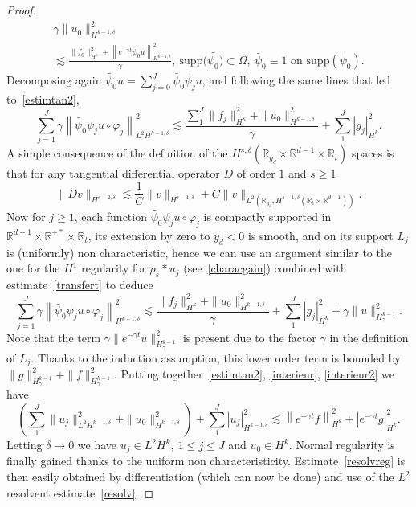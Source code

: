 \documentclass[10pt]{amsart}
\theoremstyle{definition}\newtheorem{defi}[theo]{Definition}\newtheorem{rema}[theo]{Remark}\newtheorem{exam}[theo]{Example}\newtheorem{exem}[theo]{Example}\newtheorem{nota}[theo]{Notation}
\newcommand{\R}{\mathbb{R}}
\newcommand{\supp}{\mathrm{supp}}
\begin{document}
\begin{proof}
\begin{multline}\label{interieur}
\gamma \|u_0\|_{H^{k-1,\delta}}^2
\\
\lesssim \frac{\|f_0\|_{H^k}^2 +\left\|e^{-\gamma t}\widetilde{\psi_0}u\right\|_{H^{k-1,\delta}}^2}{\gamma},\ \supp(\widetilde{\psi_0)}\subset \Omega,\
\widetilde{\psi_0}\equiv 1\text{ on }
\supp(\psi_0).
\end{multline}
Decomposing again $\widetilde{\psi_0}u =\sum_{j=0}^J \widetilde{\psi_0}\psi_ju$, and following the same lines that led to~\eqref{estimtan2},
\begin{equation}
\sum_{j=1}^J\gamma \left\|\widetilde{\psi_0}
\psi_j u\circ \varphi_j\right\|_{L^2H^{k-1,\delta}}^2 \lesssim
\frac{\sum_1^J\|f_j\|_{H^k}^2+\|u_0\|_{H^{k-1,\delta}}^2}{\gamma}+\sum_1^J|g_j|_{H^k}^2.
\end{equation}
A simple consequence of the definition of the $H^{s,\delta}(\R_{y_d}\times \R^{d-1}\times \R_t)$ spaces is that for any tangential differential operator $D$ of order $1$ and $s\geq 1$
\begin{equation}\label{transfert}
\|Dv\|_{H^{s-2,\delta}}\lesssim
\frac{1}{C}\|v\|_{H^{s-1,\delta}}+C\|v\|_{L^2\left(\R_{y_d},H^{s-1,\delta}\left(\R_t\times \R^{d-1}\right)\right)}.
\end{equation}
Now for $j\geq 1$, each function $\widetilde{\psi_0}\psi_ju\circ \varphi_j$ is compactly supported in $\R^{d-1}\times \R^{+*}\times \R_t$, its extension by zero to $y_d<0$ is smooth, and on its support $L_j$ is (uniformly) non characteristic, hence we can use an argument similar to the one for the $H^1$ regularity for $\rho_\varepsilon*u_j$ (see~\eqref{characgain}) combined with estimate~\eqref{transfert} to deduce
\begin{equation}\label{interieur2}
\sum_{j=1}^J\gamma \left\|\widetilde{\psi_0}
\psi_j u\circ \varphi_j\right\|_{H^{k-1,\delta}}^2
\lesssim
\frac{\|f_j\|_{H^k}^2+\|u_0\|_{H^{k-1,\delta}}^2}{\gamma} +\sum_1^J|g_j|_{H^k}^2 +\gamma \|u\|_{H^{k-1}_\gamma}^2.
\end{equation}
Note that the term $\gamma\|e^{-\gamma t}u\|_{H^{k-1}_\gamma}^2$ is present due to the factor $\gamma$ in the definition of $L_j$. Thanks to the induction assumption, this lower order term is bounded by $\|g\|_{H^{k-1}_\gamma}^2+\|f\|_{H^{k-1}_\gamma}^2$. Putting together~\eqref{estimtan2}, \eqref{interieur}, \eqref{interieur2} we have
\[
\left(\sum_1^J\|u_j\|_{L^2H^{k-1,\delta}}^2+\|u_0\|_{H^{k-1,\delta}}^2\right) +\sum_1^J|u_j|_{H^{k-1,\delta}}^2
\lesssim \left\|e^{-\gamma t}f\right\|_{H^k}^2 +|e^{-\gamma t}g|_{H^k}^2.
\]
Letting $\delta\to 0$ we have $u_j\in L^2H^k,\ 1\leq j\leq J$ and $u_0\in H^k$. Normal regularity is finally gained thanks to the uniform non characteristicity. Estimate~\eqref{resolvreg} is then easily obtained by differentiation (which can now be done) and use of the $L^2$ resolvent estimate~\eqref{resolv}.
\end{proof}
\end{document}
